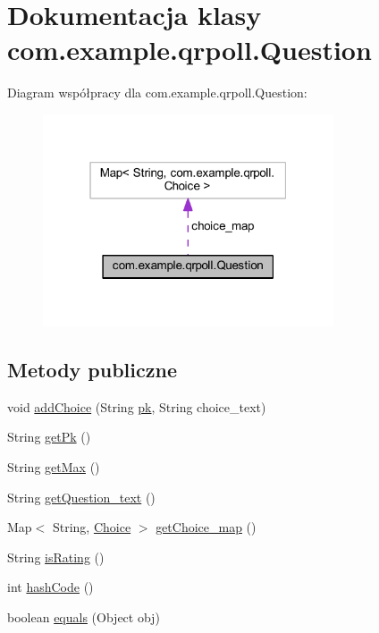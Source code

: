 \hypertarget{classcom_1_1example_1_1qrpoll_1_1_question}{\section{Dokumentacja klasy com.\+example.\+qrpoll.\+Question}
\label{classcom_1_1example_1_1qrpoll_1_1_question}
}


Diagram współpracy dla com.\+example.\+qrpoll.\+Question\+:
\nopagebreak
\begin{figure}[H]
\begin{center}
\leavevmode
\includegraphics[width=244pt]{classcom_1_1example_1_1qrpoll_1_1_question__coll__graph}
\end{center}
\end{figure}
\subsection*{Metody publiczne}
\begin{DoxyCompactItemize}
\item 
void \hyperlink{classcom_1_1example_1_1qrpoll_1_1_question_ab9e20bf997816ae32b9e3312f48d124f}{add\+Choice} (String \hyperlink{classcom_1_1example_1_1qrpoll_1_1_question_ab94e31e243d24239faf4ae4c68c28f0b}{pk}, String choice\+\_\+text)
\item 
String \hyperlink{classcom_1_1example_1_1qrpoll_1_1_question_a7b4c664c6c4ebec154ea7132c75bc88d}{get\+Pk} ()
\item 
String \hyperlink{classcom_1_1example_1_1qrpoll_1_1_question_a06182185a203fccb72e4421a10a8a511}{get\+Max} ()
\item 
String \hyperlink{classcom_1_1example_1_1qrpoll_1_1_question_ac79778f9afb3c040d0c6f4ada39fb34a}{get\+Question\+\_\+text} ()
\item 
Map$<$ String, \hyperlink{classcom_1_1example_1_1qrpoll_1_1_choice}{Choice} $>$ \hyperlink{classcom_1_1example_1_1qrpoll_1_1_question_a7ec19ad963a2fcaa76c29feb59129702}{get\+Choice\+\_\+map} ()
\item 
String \hyperlink{classcom_1_1example_1_1qrpoll_1_1_question_aa5e300a74cf22554ee7221da00aff666}{is\+Rating} ()
\item 
int \hyperlink{classcom_1_1example_1_1qrpoll_1_1_question_a3608f9d26af608c85ac88ee48e68f624}{hash\+Code} ()
\item 
boolean \hyperlink{classcom_1_1example_1_1qrpoll_1_1_question_a9aa72d6cf0140674837bd6f2399631ed}{equals} (Object obj)
\end{DoxyCompactItemize}
